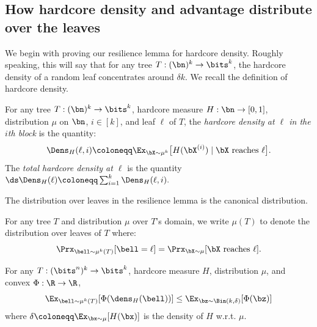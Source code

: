 \subsection{How hardcore density and advantage distribute over the leaves}
\label{subsec:understand-hardcore}
We begin with proving our resilience lemma for hardcore density. Roughly speaking, this will say that for any tree $T:(\bn)^k \to \bits^k$, the hardcore density of a random leaf concentrates around $\delta k$. We recall the definition of hardcore density.
\begin{definition}
\label{def:hardcore-density-body}
For any tree $T:(\bn)^k \to \bits^k$, hardcore measure $H:\bn \to [0,1]$, distribution $\mu$ on $\bn$, $i\in [k]$, and leaf $\ell$ of $T$, the {\sl hardcore density at $\ell$ in the $i$th block} is the quantity: 
\[ \Dens_H(\ell,i)\coloneqq \Ex_{\bX\sim \mu^k}\big[H(\bX^{(i)})\mid \text{$\bX$ reaches $\ell$}\big]. \]
The {\sl total hardcore density at $\ell$} is the quantity $\ds \Dens_H(\ell) \coloneqq \sum_{i =1}^k \Dens_H(\ell,i).$
\end{definition}
The distribution over leaves in the resilience lemma is the canonical distribution.
\begin{definition}
    \label{def:canonical-dist}
    For any tree $T$ and distribution $\mu$ over $T$'s domain, we write $\mu(T)$ to denote the distribution over leaves of $T$ where:  
\[ \Prx_{\bell\sim \mu^k(T)}[\bell = \ell] = \Prx_{\bX\sim \mu}[\text{$\bX$ reaches $\ell$}].\]
\end{definition}
\begin{lemma}
    \label{lem:resilience-general}
    For any $T:(\bits^n)^k \to \bits^k$, hardcore measure $H$, distribution $\mu$, and convex $\Phi:\R \to \R$,
    \begin{equation*}
        \Ex_{\bell \sim \mu^k(T)}[\Phi(\dens_H(\bell))] \leq \Ex_{\bz \sim \Bin(k,\delta)}[\Phi(\bz)]
    \end{equation*}
    where $\delta \coloneqq \Ex_{\bx \sim \mu}[H(\bx)]$ is the density of $H$ w.r.t. $\mu$.
\end{lemma}

